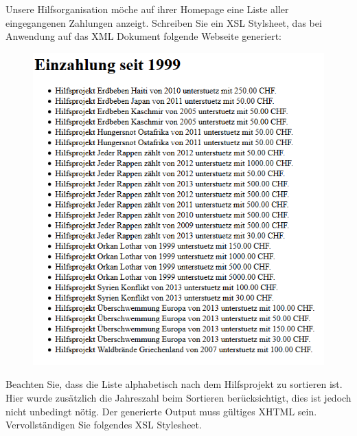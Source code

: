 Unsere Hilfsorganisation möche auf ihrer Homepage eine Liste aller eingegangenen Zahlungen anzeigt.  Schreiben Sie ein XSL Stylsheet, das bei Anwendung auf das XML Dokument folgende Webseite generiert:

\begin{figure}[H]
\centering
\includegraphics[scale=0.4]{fig/xslt_bootcamp_ziel.png}
\end{figure}


Beachten Sie, dass die Liste alphabetisch nach dem Hilfsprojekt zu sortieren ist. Hier wurde zusätzlich die Jahreszahl beim Sortieren berücksichtigt, dies ist jedoch nicht unbedingt nötig. Der generierte Output muss gültiges XHTML sein. Vervollständigen Sie folgendes XSL Stylesheet.

